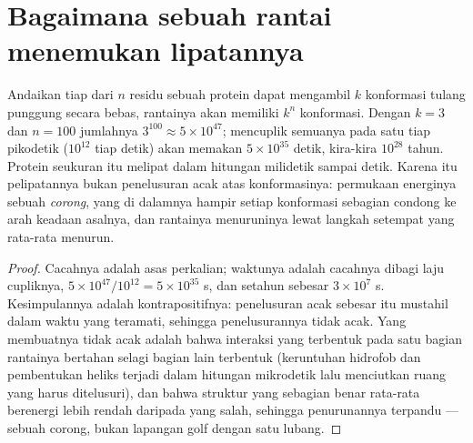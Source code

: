 \section{Bagaimana sebuah rantai menemukan lipatannya}

\begin{theorem}\label{thm:b3:structural-biology:levinthal}
Andaikan tiap dari $n$ residu sebuah protein dapat mengambil $k$ konformasi
tulang punggung secara bebas, rantainya akan memiliki $k^{n}$ konformasi.
Dengan $k = 3$ dan $n = 100$ jumlahnya $3^{100} \approx
5\times 10^{47}$; mencuplik semuanya pada satu tiap pikodetik ($10^{12}$ tiap
detik) akan memakan $5\times 10^{35}$ detik, kira-kira $10^{28}$ tahun.
Protein seukuran itu melipat dalam hitungan milidetik sampai detik. Karena itu
pelipatannya bukan penelusuran acak atas konformasinya: permukaan energinya
sebuah \emph{corong}, yang di dalamnya hampir setiap konformasi sebagian
condong ke arah keadaan asalnya, dan rantainya menuruninya lewat langkah
setempat yang rata-rata menurun.
\end{theorem}
\begin{proof}
Cacahnya adalah asas perkalian; waktunya adalah cacahnya dibagi laju
cupliknya, $5\times 10^{47}/10^{12} = 5\times
10^{35}$ s, dan setahun sebesar $3\times 10^{7}$ s. Kesimpulannya adalah
kontrapositifnya: penelusuran acak sebesar itu mustahil dalam waktu yang
teramati, sehingga penelusurannya tidak acak. Yang membuatnya tidak acak
adalah bahwa interaksi yang terbentuk pada satu bagian rantainya bertahan
selagi bagian lain terbentuk (keruntuhan hidrofob dan pembentukan heliks
terjadi dalam hitungan mikrodetik lalu menciutkan ruang yang harus
ditelusuri), dan bahwa struktur yang sebagian benar rata-rata berenergi lebih
rendah daripada yang salah, sehingga penurunannya terpandu --- sebuah corong,
bukan lapangan golf dengan satu lubang.
\end{proof}

